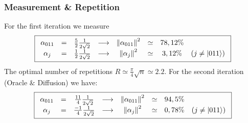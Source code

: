 \begin{frame}[t]
	\frametitle{Measurement \& Repetition}	
	For the first iteration we measure
		\[
		\boxed{
		\begin{array}{cccccccc}
			\alpha_{011} &=& \frac{5}{2}\frac{1}{2\sqrt{2}}&\longrightarrow& \left\| \alpha_{011}\right\|^2 &\simeq& 78,12\% &\\
			\alpha_{j} &=& \frac{1}{2}\frac{1}{2\sqrt{2}}&\longrightarrow& \left\| \alpha_{j}\right\|^2 &\simeq& 3,12\% & \left(j\neq \ket{011}\right)\\
		\end{array}
		}
		\]
	The optimal number of repetitions $R\simeq\frac{\pi}{4}\sqrt{n}\simeq 2.2$. 
	For the second iteration (Oracle $\&$ Diffusion) we have:
		 \[
		 \boxed{
		 	\begin{array}{cccccccc}
		 	\alpha_{011} &=& \frac{11}{4}\frac{1}{2\sqrt{2}}&\longrightarrow& \left\| \alpha_{011}\right\|^2 &\simeq& 94,5\% &\\
		 	\alpha_{j} &=& \frac{-1}{4}\frac{1}{2\sqrt{2}}&\longrightarrow& \left\| \alpha_{j}\right\|^2 &\simeq& 0,78\% & \left(j\neq \ket{011}\right)\\
		 	\end{array}
		 }
		\]
\end{frame}